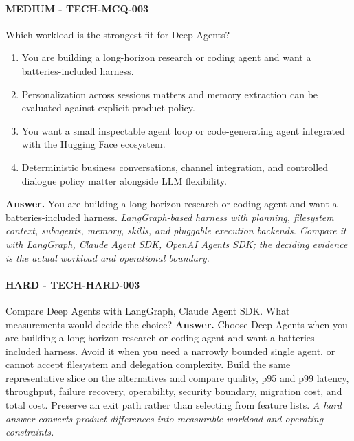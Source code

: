 \paragraph{MEDIUM - TECH-MCQ-003} Which workload is the strongest fit for Deep Agents?
\begin{enumerate}[label=\Alph*.]
\item You are building a long-horizon research or coding agent and want a batteries-included harness.
\item Personalization across sessions matters and memory extraction can be evaluated against explicit product policy.
\item You want a small inspectable agent loop or code-generating agent integrated with the Hugging Face ecosystem.
\item Deterministic business conversations, channel integration, and controlled dialogue policy matter alongside LLM flexibility.
\end{enumerate}
\textbf{Answer.} You are building a long-horizon research or coding agent and want a batteries-included harness.
\textit{LangGraph-based harness with planning, filesystem context, subagents, memory, skills, and pluggable execution backends. Compare it with LangGraph, Claude Agent SDK, OpenAI Agents SDK; the deciding evidence is the actual workload and operational boundary.}
\paragraph{HARD - TECH-HARD-003} Compare Deep Agents with LangGraph, Claude Agent SDK. What measurements would decide the choice?
\textbf{Answer.} Choose Deep Agents when you are building a long-horizon research or coding agent and want a batteries-included harness. Avoid it when you need a narrowly bounded single agent, or cannot accept filesystem and delegation complexity. Build the same representative slice on the alternatives and compare quality, p95 and p99 latency, throughput, failure recovery, operability, security boundary, migration cost, and total cost. Preserve an exit path rather than selecting from feature lists.
\textit{A hard answer converts product differences into measurable workload and operating constraints.}
